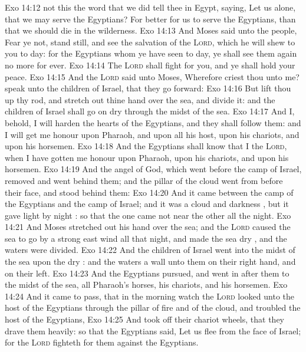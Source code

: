 \vs Exo 14:12  not this the word that we did tell thee in Egypt, saying, Let us alone, that we may serve the Egyptians? For  better for us to serve the Egyptians, than that we should die in the wilderness.
\vs Exo 14:13 And Moses said unto the people, Fear ye not, stand still, and see the salvation of the \textsc{Lord}, which he will shew to you to day: for the Egyptians whom ye have seen to day, ye shall see them again no more for ever.
\vs Exo 14:14 The \textsc{Lord} shall fight for you, and ye shall hold your peace.
\vs Exo 14:15 And the \textsc{Lord} said unto Moses, Wherefore criest thou unto me? speak unto the children of Israel, that they go forward:
\vs Exo 14:16 But lift thou up thy rod, and stretch out thine hand over the sea, and divide it: and the children of Israel shall go on dry  through the midst of the sea.
\vs Exo 14:17 And I, behold, I will harden the hearts of the Egyptians, and they shall follow them: and I will get me honour upon Pharaoh, and upon all his host, upon his chariots, and upon his horsemen.
\vs Exo 14:18 And the Egyptians shall know that I  the \textsc{Lord}, when I have gotten me honour upon Pharaoh, upon his chariots, and upon his horsemen.
\vs Exo 14:19 And the angel of God, which went before the camp of Israel, removed and went behind them; and the pillar of the cloud went from before their face, and stood behind them:
\vs Exo 14:20 And it came between the camp of the Egyptians and the camp of Israel; and it was a cloud and darkness , but it gave light by night : so that the one came not near the other all the night.
\vs Exo 14:21 And Moses stretched out his hand over the sea; and the \textsc{Lord} caused the sea to go  by a strong east wind all that night, and made the sea dry , and the waters were divided.
\vs Exo 14:22 And the children of Israel went into the midst of the sea upon the dry : and the waters  a wall unto them on their right hand, and on their left.
\vs Exo 14:23 And the Egyptians pursued, and went in after them to the midst of the sea,  all Pharaoh's horses, his chariots, and his horsemen.
\vs Exo 14:24 And it came to pass, that in the morning watch the \textsc{Lord} looked unto the host of the Egyptians through the pillar of fire and of the cloud, and troubled the host of the Egyptians,
\vs Exo 14:25 And took off their chariot wheels, that they drave them heavily: so that the Egyptians said, Let us flee from the face of Israel; for the \textsc{Lord} fighteth for them against the Egyptians.
